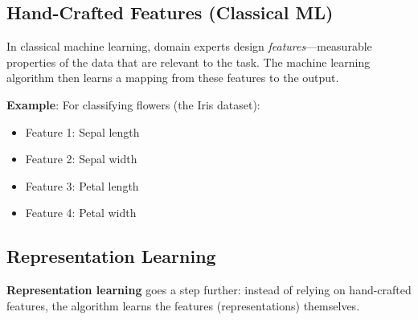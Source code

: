 \subsection{Hand-Crafted Features (Classical ML)}

In classical machine learning, domain experts design \textit{features}---measurable properties of the data that are relevant to the task. The machine learning algorithm then learns a mapping from these features to the output.

\begin{center}
\end{center}

\textbf{Example}: For classifying flowers (the Iris dataset):
\begin{itemize}
    \item Feature 1: Sepal length
    \item Feature 2: Sepal width
    \item Feature 3: Petal length
    \item Feature 4: Petal width
\end{itemize}

\subsection{Representation Learning}

\textbf{Representation learning} goes a step further: instead of relying on hand-crafted features, the algorithm learns the features (representations) themselves.

